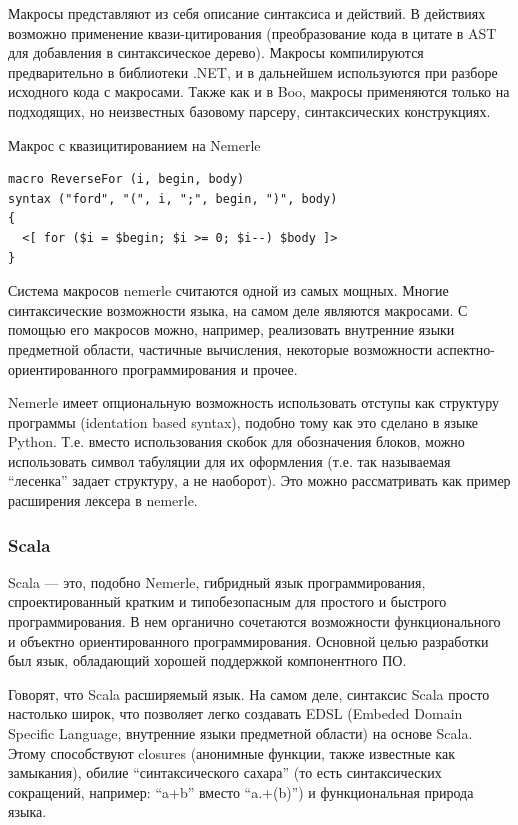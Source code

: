 \documentclass[a4paper,12pt]{article}
\begin{document}
Макросы представляют из себя описание синтаксиса и действий. В действиях
возможно применение квази-цитирования (преобразование кода в цитате в AST для
добавления в синтаксическое дерево). Макросы компилируются предварительно в
библиотеки .NET, и в дальнейшем используются при разборе исходного кода с
макросами. Также как и в Boo, макросы применяются только на подходящих, но
неизвестных базовому парсеру, синтаксических конструкциях.

\begin{example}
Макрос с квазицитированием на Nemerle
\end{example}
\begin{verbatim}
macro ReverseFor (i, begin, body) 
syntax ("ford", "(", i, ";", begin, ")", body)
{
  <[ for ($i = $begin; $i >= 0; $i--) $body ]>
}
\end{verbatim}

Система макросов nemerle считаются одной из самых мощных. Многие
синтаксические возможности языка, на самом деле являются макросами. С помощью
его макросов можно, например, реализовать внутренние языки предметной области,
частичные вычисления, некоторые возможности аспектно-ориентированного
программирования и прочее.

Nemerle имеет опциональную возможность использовать отступы как структуру
программы (identation based syntax), подобно тому как это сделано в языке
Python. Т.е. вместо использования скобок для обозначения блоков, можно
использовать символ табуляции для их оформления (т.е. так называемая
``лесенка'' задает структуру, а не наоборот). Это можно рассматривать как
пример расширения лексера в nemerle.

\subsubsection{Scala}
Scala — это, подобно Nemerle, гибридный язык программирования, спроектированный
кратким и типобезопасным для простого и быстрого программирования. В нем органично
сочетаются возможности функционального и объектно ориентированного
программирования. Основной целью разработки был язык, обладающий хорошей
поддержкой компонентного ПО.

Говорят, что Scala расширяемый язык. На самом деле, синтаксис Scala просто
настолько широк, что позволяет легко создавать EDSL (Embeded Domain Specific
Language, внутренние языки предметной области) на основе Scala. Этому
способствуют closures (анонимные функции, также известные как замыкания), обилие
``синтаксического сахара'' (то есть синтаксических сокращений, например:
``a+b'' вместо ``a.+(b)'') и функциональная природа языка.
\end{document}
